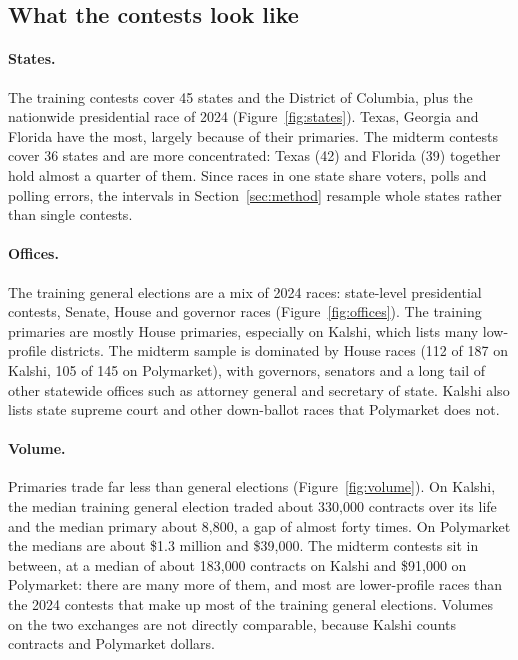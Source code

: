 \subsection{What the contests look like}

\paragraph{States.} The training contests cover 45 states and the District of Columbia, plus the nationwide
presidential race of 2024 (Figure~\ref{fig:states}). Texas, Georgia and Florida have the most, largely because of
their primaries. The midterm contests cover 36 states and are more concentrated: Texas (42) and Florida (39) together
hold almost a quarter of them. Since races in one state share voters, polls and polling errors, the intervals in
Section~\ref{sec:method} resample whole states rather than single contests.

\paragraph{Offices.} The training general elections are a mix of 2024 races: state-level presidential contests,
Senate, House and governor races (Figure~\ref{fig:offices}). The training primaries are mostly House primaries,
especially on Kalshi, which lists many low-profile districts. The midterm sample is dominated by House races (112 of 187
on Kalshi, 105 of 145 on Polymarket), with governors, senators and a long tail of other statewide offices such as
attorney general and secretary of state. Kalshi also lists state supreme court and other down-ballot races that
Polymarket does not.

\paragraph{Volume.} Primaries trade far less than general elections (Figure~\ref{fig:volume}). On Kalshi, the median
training general election traded about 330{,}000 contracts over its life and the median primary about 8{,}800, a gap of
almost forty times. On Polymarket the medians are about \$1.3 million and \$39{,}000. The midterm contests sit in
between, at a median of about 183{,}000 contracts on Kalshi and \$91{,}000 on Polymarket: there are many more of them,
and most are lower-profile races than the 2024 contests that make up most of the training general elections. Volumes
on the two exchanges are not directly comparable, because Kalshi counts contracts and Polymarket dollars.

